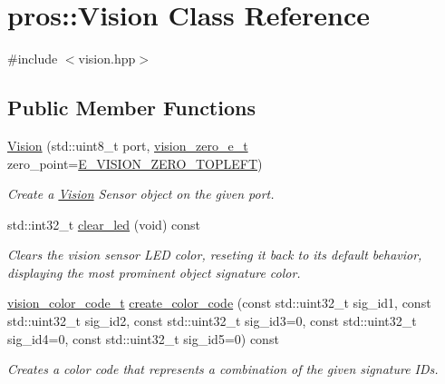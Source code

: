 \hypertarget{classpros_1_1Vision}{}\section{pros\+:\+:Vision Class Reference}
\label{classpros_1_1Vision}


{\ttfamily \#include $<$vision.\+hpp$>$}

\subsection*{Public Member Functions}
\begin{DoxyCompactItemize}
\item 
\hyperlink{classpros_1_1Vision_a46cdaf74713f630b5bb5f4d0d3259dcd}{Vision} (std\+::uint8\+\_\+t port, \hyperlink{vision_8h_a2e8bc1c48f8aab12275bfc1868fbbad6}{vision\+\_\+zero\+\_\+e\+\_\+t} zero\+\_\+point=\hyperlink{vision_8h_aef7c8269b3fb0dfbf4e597b2d8dd7af5a0ff244c5f3e9771f962986e25b00ff3d}{E\+\_\+\+V\+I\+S\+I\+O\+N\+\_\+\+Z\+E\+R\+O\+\_\+\+T\+O\+P\+L\+E\+FT})
\begin{DoxyCompactList}\small\item\em Create a \hyperlink{classpros_1_1Vision}{Vision} Sensor object on the given port. \end{DoxyCompactList}\item 
std\+::int32\+\_\+t \hyperlink{classpros_1_1Vision_a00f02cfb09ca224c2a7735be918e941d}{clear\+\_\+led} (void) const
\begin{DoxyCompactList}\small\item\em Clears the vision sensor L\+ED color, reseting it back to its default behavior, displaying the most prominent object signature color. \end{DoxyCompactList}\item 
\hyperlink{vision_8h_a71f2011a47e95558bb534b05c16c7f2b}{vision\+\_\+color\+\_\+code\+\_\+t} \hyperlink{classpros_1_1Vision_ab50bcfb700b591e2f1654962baac400f}{create\+\_\+color\+\_\+code} (const std\+::uint32\+\_\+t sig\+\_\+id1, const std\+::uint32\+\_\+t sig\+\_\+id2, const std\+::uint32\+\_\+t sig\+\_\+id3=0, const std\+::uint32\+\_\+t sig\+\_\+id4=0, const std\+::uint32\+\_\+t sig\+\_\+id5=0) const
\begin{DoxyCompactList}\small\item\em Creates a color code that represents a combination of the given signature I\+Ds. \end{DoxyCompactList}\item 

\end{DoxyCompactItemize}
